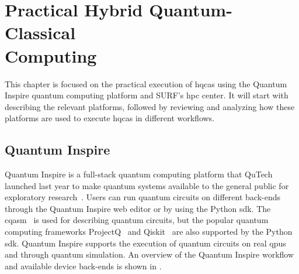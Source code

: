 \chapter[Practical Hybrid Quantum-Classical Computing]{Practical Hybrid Quantum-Classical\\Computing} \label{chap:practical-hybrid-quantum-classical-computing}
This chapter is focused on the practical execution of \glspl{hqca} using the Quantum Inspire quantum computing platform and SURF's \gls{hpc} center.
It will start with describing the relevant platforms, followed by reviewing and analyzing how these platforms are used to execute \glspl{hqca} in different workflows.

\section{Quantum Inspire}
Quantum Inspire is a full-stack quantum computing platform that QuTech launched last year to make quantum systems available to the general public for exploratory research~\cite{last2020quantum}.
Users can run quantum circuits on different back-ends through the Quantum Inspire web editor or by using the Python \gls{sdk}.
The \gls{cqasm}~\cite{khammassi2018cqasm} is used for describing quantum circuits, but the popular quantum computing frameworks ProjectQ~\cite{steiger2018projectq} and Qiskit~\cite{qiskit} are also supported by the Python \gls{sdk}.
Quantum Inspire supports the execution of quantum circuits on real \glspl{qpu} and through quantum simulation.
An overview of the Quantum Inspire workflow and available device back-ends is shown in .

